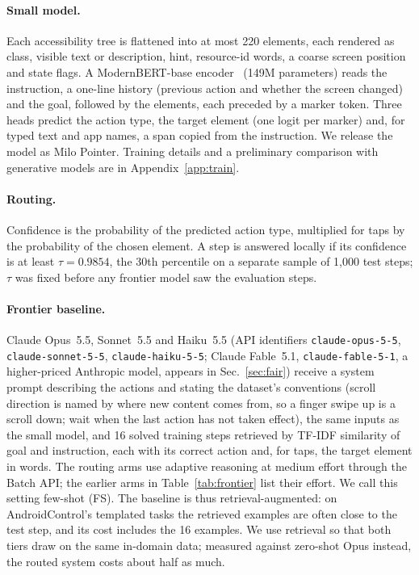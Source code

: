 \documentclass[10pt]{article}
\begin{document}
\paragraph{Small model.} Each accessibility tree is flattened into at most 220 elements, each rendered as class, visible text or description, hint, resource-id words, a coarse screen position and state flags. A ModernBERT-base encoder~\citep{modernbert} (149M parameters) reads the instruction, a one-line history (previous action and whether the screen changed) and the goal, followed by the elements, each preceded by a marker token. Three heads predict the action type, the target element (one logit per marker) and, for typed text and app names, a span copied from the instruction. We release the model as Milo Pointer. Training details and a preliminary comparison with generative models are in Appendix~\ref{app:train}.

\paragraph{Routing.} Confidence is the probability of the predicted action type, multiplied for taps by the probability of the chosen element. A step is answered locally if its confidence is at least $\tau = 0.9854$, the 30th percentile on a separate sample of 1{,}000 test steps; $\tau$ was fixed before any frontier model saw the evaluation steps.

\paragraph{Frontier baseline.} Claude Opus~5.5, Sonnet~5.5 and Haiku~5.5 (API identifiers \texttt{claude-opus-5-5}, \texttt{claude-sonnet-5-5}, \texttt{claude-haiku-5-5}; Claude Fable~5.1, \texttt{claude-fable-5-1}, a higher-priced Anthropic model, appears in Sec.~\ref{sec:fair}) receive a system prompt describing the actions and stating the dataset's conventions (scroll direction is named by where new content comes from, so a finger swipe up is a scroll down; wait when the last action has not taken effect), the same inputs as the small model, and 16 solved training steps retrieved by TF-IDF similarity of goal and instruction, each with its correct action and, for taps, the target element in words. The routing arms use adaptive reasoning at medium effort through the Batch API; the earlier arms in Table~\ref{tab:frontier} list their effort. We call this setting few-shot (FS). The baseline is thus retrieval-augmented: on AndroidControl's templated tasks the retrieved examples are often close to the test step, and its cost includes the 16 examples. We use retrieval so that both tiers draw on the same in-domain data; measured against zero-shot Opus instead, the routed system costs about half as much.
\end{document}
